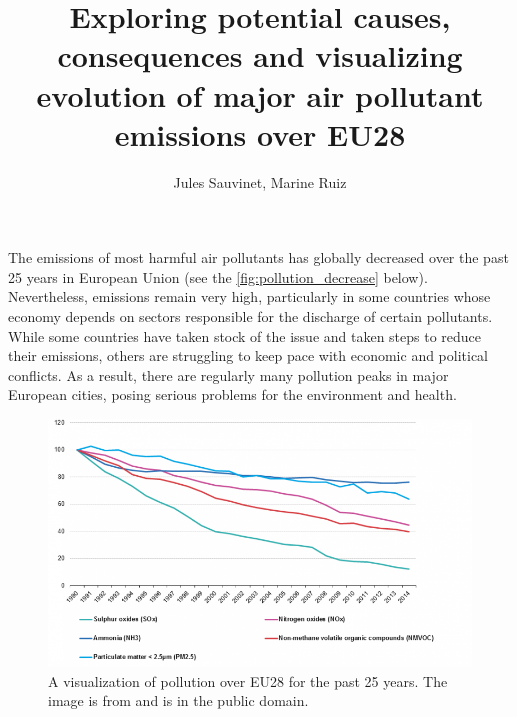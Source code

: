 \documentclass[preprint,journal]{vgtc}       %
\title{Exploring potential causes, consequences and visualizing evolution of major air pollutant emissions over EU28}
\author{Jules Sauvinet, Marine Ruiz}
\begin{document}


\maketitle

\paragraph{}
The emissions of most harmful air pollutants has globally decreased over the past 25 years in European Union (see the \autoref{fig:pollution_decrease} below).
Nevertheless, emissions remain very high, particularly in some countries whose economy depends on sectors responsible for the discharge of certain pollutants. While some countries have taken stock of the issue and taken steps to reduce their emissions, others are struggling to keep pace with economic and political conflicts.
As a result, there are regularly many pollution peaks in major European cities, posing serious problems for the environment and health.

\begin{figure}[H]
 \centering %
 \includegraphics[width=\columnwidth]{decreased_emissions}
 \caption{A visualization of pollution over EU28 for the past 25 years. The image is from \cite{Eurostats:2016:VMC} and is in the public domain.}
 \label{fig:pollution_decrease}
\end{figure}
\end{document}
